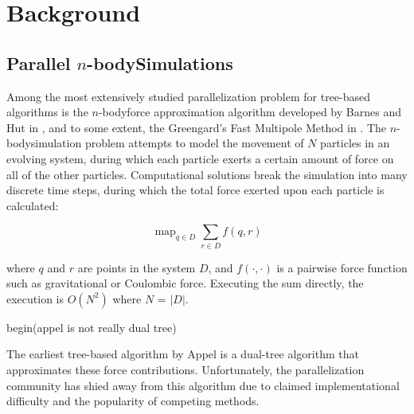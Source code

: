 \documentclass[times, 10pt,twocolumn]{article}
\DeclareMathOperator*{\map}{map}
\newcommand{\nbody}{$n$-body}
\begin{document}
%
%
%
%
%
%
%
%

\section{Background}

\subsection{Parallel \nbody Simulations}

Among the most extensively studied parallelization problem for tree-based algorithms is the \nbody force approximation algorithm developed by Barnes and Hut in \cite{barneshut}, and to some extent, the Greengard's Fast Multipole Method in \cite{fmm}.
The \nbody simulation problem attempts to model the movement of $N$ particles in an evolving system, during which each particle exerts a certain amount of force on all of the other particles.
Computational solutions break the simulation into many discrete time steps, during which the total force exerted upon each particle is calculated:

 $$\map_{q \in D} \sum_{r \in D} f(q, r)$$

\noindent where $q$ and $r$ are points in the system $D$, and $f(\cdot, \cdot)$ is a pairwise force function such as gravitational or Coulombic force.
Executing the sum directly, the execution is $O(N^2)$ where $N$ = $|D|$.

begin(appel is not really dual tree)

The earliest tree-based algorithm by Appel \cite{appel} is a dual-tree algorithm that approximates these force contributions.
Unfortunately, the parallelization community has shied away from this algorithm due to claimed implementational difficulty and the popularity of competing methods.
\end{document}
